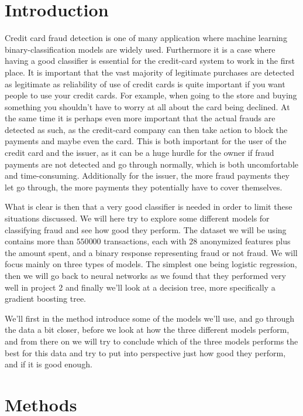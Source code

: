 \documentclass{article}
\begin{document}
\section{Introduction}
Credit card fraud detection is one of many application where machine learning
binary-classification models are widely used. Furthermore it is a case where
having a good classifier is essential for the credit-card system to work in the
first place. It is important that the vast majority of legitimate purchases are
detected as legitimate as reliability of use of credit cards is quite important
if you want people to use your credit cards. For example, when going to the
store and buying something you shouldn't have to worry at all about the card being
declined. At the same time it is perhaps even more important that the actual
frauds are detected as such, as the credit-card company can then take action to
block the payments and maybe even the card. This is both important for the user
of the credit card and the issuer, as it can be a huge hurdle for the owner if
fraud payments are not detected and go through normally, which is both
uncomfortable and time-consuming. Additionally for the issuer, the more fraud
payments they let go through, the more payments they potentially have to cover
themselves.

What is clear is then that a very good classifier is needed in order to limit
these situations discussed. We will here try to explore some different models
for classifying fraud and see how good they perform. The dataset we will be
using contains more than $550 000$ transactions, each with $28$ anonymized
features plus the amount spent, and a binary response representing fraud or not
fraud. We will focus mainly on three types of models. The simplest one being
logistic regression, then we will go back to neural networks as we found that
they performed very well in project 2 \cite{githubrepoproject2} and finally
we'll look at a decision tree, more specifically a gradient boosting tree.

We'll first in the method introduce some of the models we'll use, and go
through the data a bit closer, before we look at how the three different models
perform, and from there on we will try to conclude which of the three models
performs the best for this data and try to put into perspective just how good
they perform, and if it is good enough.

\section{Methods}
\end{document}
